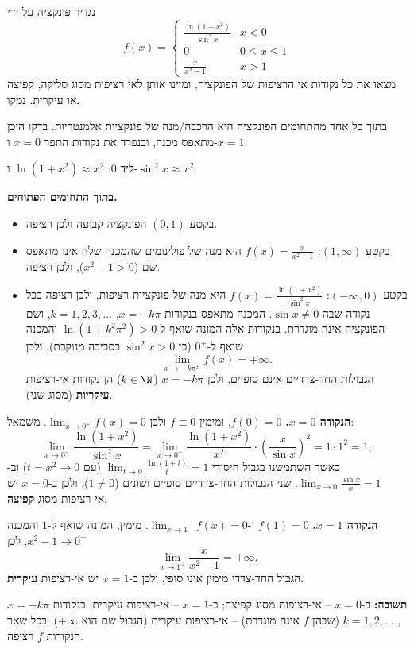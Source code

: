 
\begin{question}
נגדיר פונקציה על ידי
\[ f(x)=\begin{cases}\frac{\ln(1+x^2)}{\sin^2 x} & x<0\\ 0 & 0\le x\le 1\\ \frac{x}{x^2-1} & x>1\end{cases} \]
מצאו את כל נקודות אי הרציפות של הפונקציה, ומיינו אותן לאי רציפות מסוג סליקה, קפיצה או עיקרית. נמקו.
\end{question}

\begin{hint}
בתוך כל אחד מהתחומים הפונקציה היא הרכבה/מנה של פונקציות אלמנטריות. בדקו היכן מתאפס מכנה, ובנפרד את נקודות התפר $x=0$ ו-$x=1$.
\end{hint}

\begin{hint}
ליד $0$: $\ln(1+x^2)\approx x^2$ ו-$\sin^2x\approx x^2$.
\end{hint}

\begin{solution}
\textbf{בתוך התחומים הפתוחים.}
\begin{itemize}
  \item בקטע $(0,1)$ הפונקציה קבועה ולכן רציפה.
  \item בקטע $(1,\infty)$: $f(x)=\frac{x}{x^2-1}$ היא מנה של פולינומים שהמכנה שלה אינו מתאפס שם ($x^2-1>0$), ולכן רציפה.
  \item בקטע $(-\infty,0)$: $f(x)=\frac{\ln(1+x^2)}{\sin^2x}$ היא מנה של פונקציות רציפות, ולכן רציפה בכל נקודה שבה $\sin x\neq0$. המכנה מתאפס בנקודות $x=-k\pi$, $k=1,2,3,\dots$, ושם הפונקציה אינה מוגדרת. בנקודות אלה המונה שואף ל-$\ln(1+k^2\pi^2)>0$ והמכנה שואף ל-$0^+$ (כי $\sin^2x>0$ בסביבה מנוקבת), ולכן
  \[ \lim_{x\to-k\pi^\pm}f(x)=+\infty. \]
  הגבולות החד-צדדיים אינם סופיים, ולכן $x=-k\pi$ ($k\in\N$) הן נקודות אי-רציפות \textbf{עיקריות} (מסוג שני).
\end{itemize}

\textbf{הנקודה $x=0$.} $f(0)=0$, ומימין $f\equiv0$ ולכן $\lim_{x\to0^+}f(x)=0$. משמאל:
\[ \lim_{x\to0^-}\frac{\ln(1+x^2)}{\sin^2x}=\lim_{x\to0^-}\frac{\ln(1+x^2)}{x^2}\cdot\left(\frac{x}{\sin x}\right)^2=1\cdot1^2=1, \]
כאשר השתמשנו בגבול היסודי $\lim_{t\to0}\frac{\ln(1+t)}{t}=1$ (עם $t=x^2\to0$) וב-$\lim_{x\to0}\frac{\sin x}{x}=1$. שני הגבולות החד-צדדיים סופיים ושונים ($1\neq0$), ולכן ב-$x=0$ יש אי-רציפות מסוג \textbf{קפיצה}.

\textbf{הנקודה $x=1$.} $f(1)=0$ ו-$\lim_{x\to1^-}f(x)=0$. מימין, המונה שואף ל-$1$ והמכנה $x^2-1\to0^+$, לכן
\[ \lim_{x\to1^+}\frac{x}{x^2-1}=+\infty. \]
הגבול החד-צדדי מימין אינו סופי, ולכן ב-$x=1$ יש אי-רציפות \textbf{עיקרית}.

\textbf{תשובה:} ב-$x=0$ -- אי-רציפות מסוג קפיצה; ב-$x=1$ -- אי-רציפות עיקרית; בנקודות $x=-k\pi$, $k=1,2,\dots$ (שבהן $f$ אינה מוגדרת) -- אי-רציפות עיקרית (הגבול שם הוא $+\infty$). בכל שאר הנקודות $f$ רציפה.
\end{solution}
